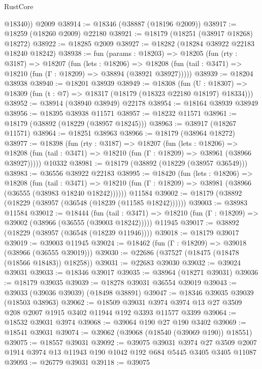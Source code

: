 \begin{lexlean}{RustCore}
\begin{coremodule}
        @18340))
    @2009
@38914 := @18346 (@38887 (@18196 @2009))
@38917 := @18259 (@18260 @2009) @22180
@38921 := @18179 (@18251 (@38917 @18268) @18272)
@38922 := @18285 @2009
@38927 := @18282 (@18284 @38922 @22183 @18240 @18242)
@38938 := fun (params : @18203) =>
  @18205
    (fun (rty : @3187) =>
    @18207
      (fun (lets : @18206) =>
      @18208 (fun (tail : @3471) => @18210 (fun (Γ : @18209) => @38894 (@38921 @38927)))))
@38939 := @18204 @38938
@38940 := @18201 @38939
@38949 := @18308
    (fun (U : @18307) => @18309 (fun (t : @7) => @18317 (@18179 (@18323 @22180 @18197) @18334)))
@38952 := @38914 (@38940 @38949) @22178
@38954 := @18164 @38939 @38949
@38956 := @18395 @38938 @11571
@38957 := @18232 @11571
@38961 := @18179 (@38892 (@18229 (@38957 @18245)))
@38963 := @38917 (@18267 @11571)
@38964 := @18251 @38963
@38966 := @18179 (@38964 @18272)
@38977 := @18398
    (fun (rty : @3187) =>
    @18207
      (fun (lets : @18206) =>
      @18208 (fun (tail : @3471) => @18210 (fun (Γ : @18209) => @38961 (@38966 @38927)))))
    @10332
@38981 := @18179 (@38892 (@18229 (@38957 @36549)))
@38983 := @36556 @38922 @22183
@38995 := @18420
    (fun (lets : @18206) =>
    @18208
      (fun (tail : @3471) =>
      @18210 (fun (Γ : @18209) => @38981 (@38966 (@36555 (@38983 @18240 @18242))))))
    @11584
@39002 := @18179 (@38892 (@18229 (@38957 (@36548 (@18239 (@11585 @18242))))))
@39003 := @38983 @11584
@39012 := @18444
    (fun (tail : @3471) => @18210 (fun (Γ : @18209) => @39002 (@38966 (@36555 (@39003 @18242)))))
    @11945
@39017 := @38892 (@18229 (@38957 (@36548 (@18239 @11946))))
@39018 := @18179 @39017
@39019 := @39003 @11945
@39024 := @18462 (fun (Γ : @18209) => @39018 (@38966 (@36555 @39019)))
@39030 := @22686 (@37527 (@18475 (@18478 (@18566 @18483)) @18258))
@39031 := @22683 @39030
@39032 := @39024 @39031
@39033 := @18346 @39017
@39035 := @38964 (@18271 @39031)
@39036 := @18179 @39035
@39039 := @18278 @39031 @36554 @39019
@39043 := @39033 (@39036 @39039) (@18498 @38891)
@39047 := @18346 @39035 @39039 (@18503 @38963)
@39062 := @18509
    @39031
    @3974
    @3974
    @13
    @27
    @3509
    @208
    @2007
    @1915
    @3402
    @11944
    @192
    @3393
    @11577
    @3399
@39064 := @18532 @39031 @3974
@39068 := @39064 @190 @27 @190 @3402
@39069 := @18541 @39031
@39074 := @39062 (@39068 (@18540 (@39069 @190)) @18551)
@39075 := @18557 @39031
@39092 := @39075
    @39031
    @3974
    @27
    @3509
    @2007
    @1914
    @3974
    @13
    @11943
    @190
    @1042
    @192
    @684
    @5445
    @3405
    @3405
    @11087
@39093 := @26779 @39031
@39118 := @39075

\end{coremodule}
\end{lexlean}
